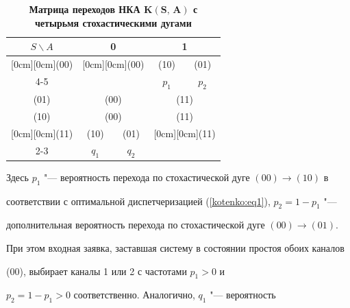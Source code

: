 \begin{table}[h!] \centering



\small



\caption{\bf Матрица переходов НКА $\boldsymbol{K(S,\,A)}$ с четырьмя стохастическими дугами}\vspace{-3mm}

\begin{tabular}{|c|c|c|c|c| }\hline

$S\backslash A$ & \multicolumn{2}{c|}{0} & \multicolumn{2}{c|}{1}  \\ \hline

\raisebox{-1.50ex}[0cm][0cm]{(00)}& \multicolumn{2}{c|}{\raisebox{-1.50ex}[0cm][0cm]{(00)}}   & (10)  & (01) \\ \cline{4-5}

    &   \multicolumn{2}{c|}{}       & $p_1$ & $p_2$ \\ \hline

(01)& \multicolumn{2}{c|}{(00)}   & \multicolumn{2}{c|}{(11)}  \\ \hline

(10)& \multicolumn{2}{c|}{(00)}   & \multicolumn{2}{c|}{(11)}  \\ \hline

\raisebox{-1.50ex}[0cm][0cm]{(11)}& (10) & (01)& \multicolumn{2}{c|}{\raisebox{-1.50ex}[0cm][0cm]{(11)}} \\ \cline{2-3}

      & $q_1$ & $q_2$ & \multicolumn{2}{c|}{}  \\ \hline

\end{tabular}

\end{table}



\noindent

Здесь $p_{1}$ "--- вероятность перехода по стохастической дуге $(00) \to (10)$ в

соответствии с оптимальной диспетчеризацией (\ref{kotenko:eq1}), $p_2=1-p_1$ "---

дополнительная вероятность перехода по стохастической дуге $(00) \to (01)$.

При этом входная заявка, заставшая систему в состоянии простоя обоих каналов

(00), выбирает каналы 1 или 2 с частотами $p_1>0$ и

$p_2=1-p_1>0$ соответственно. Аналогично, $q_1$ "--- вероятность

